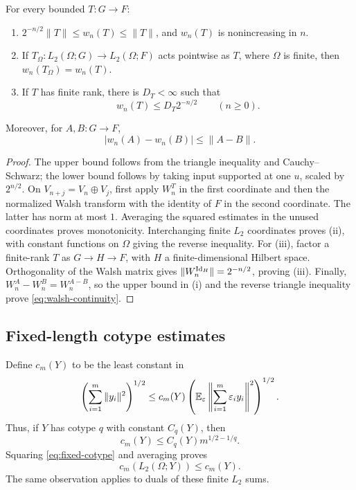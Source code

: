 \begin{lemma}\label{lem:walsh-basic}
For every bounded \(T:G\to F\):
\begin{enumerate}[label=\textup{(\roman*)}]
\item \(2^{-n/2}\|T\|\le w_n(T)\le\|T\|\), and \(w_n(T)\) is
nonincreasing in \(n\).
\item If \(T_\Omega:L_2(\Omega;G)\to L_2(\Omega;F)\) acts pointwise
as \(T\), where \(\Omega\) is finite, then
\(w_n(T_\Omega)=w_n(T)\).
\item If \(T\) has finite rank, there is \(D_T<\infty\) such that
\begin{equation}\label{eq:rank-dependent-decay}
w_n(T)\le D_T2^{-n/2}\qquad(n\ge0).
\end{equation}
\end{enumerate}
Moreover, for \(A,B:G\to F\),
\begin{equation}\label{eq:walsh-continuity}
|w_n(A)-w_n(B)|\le\|A-B\|.
\end{equation}
\end{lemma}
\begin{proof}
The upper bound follows from the triangle inequality and
Cauchy--Schwarz; the lower bound follows by taking input supported
at one \(u\), scaled by \(2^{n/2}\). On \(V_{n+j}=V_n\oplus V_j\),
first apply \(W_n^T\) in the first coordinate and then the normalized
Walsh transform with the identity of \(F\) in the second coordinate.
The latter has norm at most \(1\). Averaging the squared estimates
in the unused coordinates proves monotonicity.
Interchanging finite \(L_2\) coordinates proves (ii), with constant
functions on \(\Omega\) giving the reverse inequality.
For (iii), factor a finite-rank \(T\) as \(G\to H\to F\), with \(H\)
a finite-dimensional Hilbert space. Orthogonality of the Walsh
matrix gives \(\|W_n^{\mathrm{Id}_H}\|=2^{-n/2}\), proving (iii).
Finally, \(W_n^A-W_n^B=W_n^{A-B}\), so the upper bound in (i)
and the reverse triangle inequality prove \eqref{eq:walsh-continuity}.
\end{proof}

\subsection{Fixed-length cotype estimates}

Define \(c_m(Y)\) to be the least constant in
\begin{equation}\label{eq:fixed-cotype}
\left(\sum_{i=1}^m\|y_i\|^2\right)^{1/2}
\le c_m(Y)\left(\mathbb E_\varepsilon\left\|\sum_{i=1}^m\varepsilon_i y_i\right\|^2\right)^{1/2}.
\end{equation}
Thus, if \(Y\) has cotype \(q\) with constant \(C_q(Y)\), then
\begin{equation}\label{eq:fixed-from-cotype}
c_m(Y)\le C_q(Y)m^{1/2-1/q}.
\end{equation}
Squaring \eqref{eq:fixed-cotype} and averaging proves
\begin{equation}\label{eq:cotype-amplification}
c_m(L_2(\Omega;Y))\le c_m(Y).
\end{equation}
The same observation applies to duals of these finite \(L_2\) sums.

